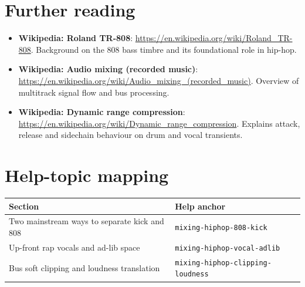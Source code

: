 \section*{Further reading}
\begin{itemize}
  \item \textbf{Wikipedia: Roland TR-808}: \url{https://en.wikipedia.org/wiki/Roland_TR-808}. Background on the 808 bass timbre and its foundational role in hip-hop.
  \item \textbf{Wikipedia: Audio mixing (recorded music)}: \url{https://en.wikipedia.org/wiki/Audio_mixing_(recorded_music)}. Overview of multitrack signal flow and bus processing.
  \item \textbf{Wikipedia: Dynamic range compression}: \url{https://en.wikipedia.org/wiki/Dynamic_range_compression}. Explains attack, release and sidechain behaviour on drum and vocal transients.
\end{itemize}

\section{Help-topic mapping}

\begin{helpmapping}
\begin{tabular}{ll}
\toprule
Section & Help anchor \\
\midrule
Two mainstream ways to separate kick and 808 & \texttt{mixing-hiphop-808-kick} \\
Up-front rap vocals and ad-lib space & \texttt{mixing-hiphop-vocal-adlib} \\
Bus soft clipping and loudness translation & \texttt{mixing-hiphop-clipping-loudness} \\
\bottomrule
\end{tabular}
\end{helpmapping}
